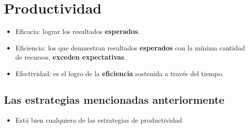 \section{Productividad}
\begin{itemize}
    \item Eficacia: lograr los resultados \textbf{esperados}. 
    \item Eficiencia: los que demuestran resultados \textbf{esperados} con la mínima cantidad de recursos, \textbf{exceden expectativas}.
    \item Efectividad: es el logro de la \textbf{eficiencia} sostenida a través del tiempo.
\end{itemize}

\subsection{Las estrategias mencionadas anteriormente}
\begin{itemize}
    \item Está bien cualquiera de las estrategias de productividad
\end{itemize}

